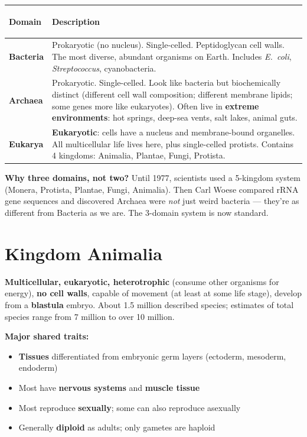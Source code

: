 \documentclass[11pt, letterpaper]{article}
\begin{document}
\noindent
{\renewcommand{\arraystretch}{1.6}
\begin{tabularx}{\textwidth}{>{\bfseries\raggedright\arraybackslash}p{2.5cm}
                              >{\raggedright\arraybackslash}X}
\toprule
\rowcolor{tableheaderpurple}
\textbf{Domain} & \textbf{Description} \\
\midrule
\rowcolor{rowPu} \textbf{Bacteria}  & Prokaryotic (no nucleus). Single-celled. Peptidoglycan cell walls. The most diverse, abundant organisms on Earth. Includes \textit{E.\ coli}, \textit{Streptococcus}, cyanobacteria. \\
\rowcolor{rowA}  \textbf{Archaea}   & Prokaryotic. Single-celled. Look like bacteria but biochemically distinct (different cell wall composition; different membrane lipids; some genes more like eukaryotes). Often live in \textbf{extreme environments}: hot springs, deep-sea vents, salt lakes, animal guts. \\
\rowcolor{rowPu} \textbf{Eukarya}   & \textbf{Eukaryotic}: cells have a nucleus and membrane-bound organelles. All multicellular life lives here, plus single-celled protists. Contains 4 kingdoms: Animalia, Plantae, Fungi, Protista. \\
\bottomrule
\end{tabularx}}

\textbf{Why three domains, not two?} Until 1977, scientists used a 5-kingdom system (Monera,
Protista, Plantae, Fungi, Animalia). Then Carl Woese compared rRNA gene sequences and
discovered Archaea were \emph{not} just weird bacteria --- they're as different from Bacteria
as we are. The 3-domain system is now standard.

\section*{Kingdom Animalia}

\textbf{Multicellular, eukaryotic, heterotrophic} (consume other organisms for energy),
\textbf{no cell walls}, capable of movement (at least at some life stage), develop from a
\textbf{blastula} embryo. About 1.5 million described species; estimates of total species
range from 7 million to over 10 million.

\textbf{Major shared traits:}
\begin{itemize}[noitemsep]
  \item \textbf{Tissues} differentiated from embryonic germ layers (ectoderm, mesoderm, endoderm)
  \item Most have \textbf{nervous systems} and \textbf{muscle tissue}
  \item Most reproduce \textbf{sexually}; some can also reproduce asexually
  \item Generally \textbf{diploid} as adults; only gametes are haploid
\end{itemize}
\end{document}
